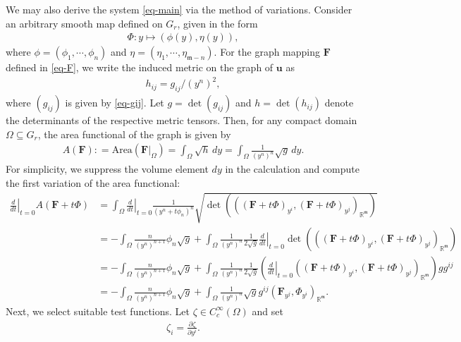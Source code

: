 \documentclass[11pt,reqno]{amsart}
\newcommand{\fm}{\mathfrak{m}}
\theoremstyle{definition}
\numberwithin{equation}{section}
\begin{document}
\medskip
We may also derive the system \eqref{eq-main} via the method of variations.
Consider an arbitrary smooth map defined on $G_r$, given in the form
\begin{align}
    \Phi: y \mapsto (\phi(y), \eta(y)),
\end{align}
where $\phi = (\phi_1, \cdots, \phi_n)$ and $\eta = (\eta_1, \cdots, \eta_{\fm -n})$. For the graph mapping $\mathbf{F}$ defined in \eqref{eq-F}, we write the induced metric on the graph of $\mathbf{u}$ as
\begin{align}\label{eq-h}
h_{ij}=g_{ij}/(y^n)^2,  
\end{align}
where $(g_{ij})$ is given by \eqref{eq-gij}.
Let $g = \det(g_{ij})$ and $h = \det(h_{ij})$ denote the determinants of the respective metric tensors. Then, for any compact domain $\Omega \subseteq G_r$, the area functional of the graph is given by
\begin{align}
    A(\mathbf{F}): =\mathrm{Area}(\mathbf{F}|_{\Omega})=\int_\Omega\sqrt{h} \,dy=\int_\Omega \frac{1}{(y^n)^n}\sqrt{g}\, dy.
\end{align}
For simplicity, we suppress the volume element $dy$ in the calculation and compute the first variation of the area functional:
\begin{equation}\label{area-F}
\begin{aligned}
\left.\frac{d}{dt}\right|_{t=0}A(\mathbf{F}+t \Phi)
&=\int_{\Omega}\left.\frac{d}{dt}\right|_{t=0}\frac{1}{(y^n+t\phi_n)^n}\sqrt{\det\left(\left((\mathbf{F}+t\Phi)_{y^i},(\mathbf{F}+t\Phi)_{y^j}\right)_{\mathbb{R}^{\fm}}\right)}\\
&=-\int_\Omega \frac{n}{(y^n)^{n+1}}\phi_n\sqrt{g}+\int_\Omega \frac{1}{(y^n)^{n}}\frac{1}{2\sqrt{g}}\left.\frac{d}{dt}\right|_{t=0}\det\left(\left( (\mathbf{F}+t\Phi)_{y^i},(\mathbf{F}+t\Phi)_{y^j}\right)_{\mathbb{R}^{\fm}}\right)\\
&=-\int_\Omega \frac{n}{(y^n)^{n+1}}\phi_n\sqrt{g}+\int_\Omega \frac{1}{(y^n)^{n}}\frac{1}{2\sqrt{g}}\left(\left.\frac{d}{dt}\right|_{t=0}\left( (\mathbf{F}+t\Phi)_{y^i},(\mathbf{F}+t\Phi)_{y^j}\right)_{\mathbb{R}^{\fm}}\right) g g^{ij}\\
&=-\int_\Omega \frac{n}{(y^n)^{n+1}}\phi_n\sqrt{g}+\int_\Omega \frac{1}{(y^n)^n}\sqrt{g}g^{ij}\left( \mathbf{F}_{y^j},\Phi_{y^i}\right)_{\mathbb{R}^{\fm}}.
\end{aligned}
\end{equation}
Next, we select suitable test functions. Let $\zeta\in C^{\infty}_c(\Omega)$ and set
\begin{align}
    \zeta_i =\frac{\partial \zeta}{\partial y^i}.
\end{align}
\end{document}

